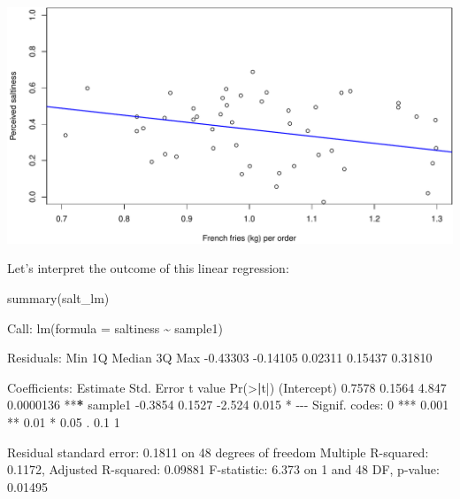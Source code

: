 \documentclass[
]{book}
\newenvironment{Shaded}{\begin{snugshade}}{\end{snugshade}}
\newcommand{\AttributeTok}[1]{\textcolor[rgb]{0.77,0.63,0.00}{#1}}
\newcommand{\DecValTok}[1]{\textcolor[rgb]{0.00,0.00,0.81}{#1}}
\newcommand{\ErrorTok}[1]{\textcolor[rgb]{0.64,0.00,0.00}{\textbf{#1}}}
\newcommand{\FloatTok}[1]{\textcolor[rgb]{0.00,0.00,0.81}{#1}}
\newcommand{\FunctionTok}[1]{\textcolor[rgb]{0.00,0.00,0.00}{#1}}
\newcommand{\NormalTok}[1]{#1}
\newcommand{\SpecialCharTok}[1]{\textcolor[rgb]{0.00,0.00,0.00}{#1}}
\newcommand{\StringTok}[1]{\textcolor[rgb]{0.31,0.60,0.02}{#1}}
\begin{document}
\includegraphics{figures/unnamed-chunk-243-1.pdf}

Let's interpret the outcome of this linear regression:

\begin{Shaded}
\begin{Highlighting}[]
\FunctionTok{summary}\NormalTok{(salt\_lm)}

\NormalTok{Call}\SpecialCharTok{:}
\FunctionTok{lm}\NormalTok{(}\AttributeTok{formula =}\NormalTok{ saltiness }\SpecialCharTok{\textasciitilde{}}\NormalTok{ sample1)}

\NormalTok{Residuals}\SpecialCharTok{:}
\NormalTok{     Min       1Q   Median       3Q      Max }
\SpecialCharTok{{-}}\FloatTok{0.43303} \SpecialCharTok{{-}}\FloatTok{0.14105}  \FloatTok{0.02311}  \FloatTok{0.15437}  \FloatTok{0.31810} 

\NormalTok{Coefficients}\SpecialCharTok{:}
\NormalTok{            Estimate Std. Error t value  }\FunctionTok{Pr}\NormalTok{(}\SpecialCharTok{\textgreater{}}\ErrorTok{|}\NormalTok{t}\SpecialCharTok{|}\NormalTok{)    }
\NormalTok{(Intercept)   }\FloatTok{0.7578}     \FloatTok{0.1564}   \FloatTok{4.847} \FloatTok{0.0000136} \SpecialCharTok{**}\ErrorTok{*}
\NormalTok{sample1      }\SpecialCharTok{{-}}\FloatTok{0.3854}     \FloatTok{0.1527}  \SpecialCharTok{{-}}\FloatTok{2.524}     \FloatTok{0.015} \SpecialCharTok{*}  
\SpecialCharTok{{-}{-}{-}}
\NormalTok{Signif. codes}\SpecialCharTok{:}  \DecValTok{0} \StringTok{\textquotesingle{}***\textquotesingle{}} \FloatTok{0.001} \StringTok{\textquotesingle{}**\textquotesingle{}} \FloatTok{0.01} \StringTok{\textquotesingle{}*\textquotesingle{}} \FloatTok{0.05} \StringTok{\textquotesingle{}.\textquotesingle{}} \FloatTok{0.1} \StringTok{\textquotesingle{} \textquotesingle{}} \DecValTok{1}

\NormalTok{Residual standard error}\SpecialCharTok{:} \FloatTok{0.1811}\NormalTok{ on }\DecValTok{48}\NormalTok{ degrees of freedom}
\NormalTok{Multiple R}\SpecialCharTok{{-}}\NormalTok{squared}\SpecialCharTok{:}  \FloatTok{0.1172}\NormalTok{,    Adjusted R}\SpecialCharTok{{-}}\NormalTok{squared}\SpecialCharTok{:}  \FloatTok{0.09881} 
\NormalTok{F}\SpecialCharTok{{-}}\NormalTok{statistic}\SpecialCharTok{:} \FloatTok{6.373}\NormalTok{ on }\DecValTok{1}\NormalTok{ and }\DecValTok{48}\NormalTok{ DF,  p}\SpecialCharTok{{-}}\NormalTok{value}\SpecialCharTok{:} \FloatTok{0.01495}
\end{Highlighting}
\end{Shaded}
\end{document}
